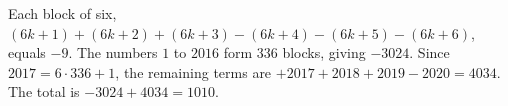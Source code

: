 Each block of six, $(6k+1)+(6k+2)+(6k+3)-(6k+4)-(6k+5)-(6k+6)$, equals $-9$. The numbers $1$ to $2016$ form $336$ blocks, giving $-3024$. Since $2017=6\cdot336+1$, the remaining terms are $+2017+2018+2019-2020=4034$. The total is $-3024+4034=\boxed{1010}$.
